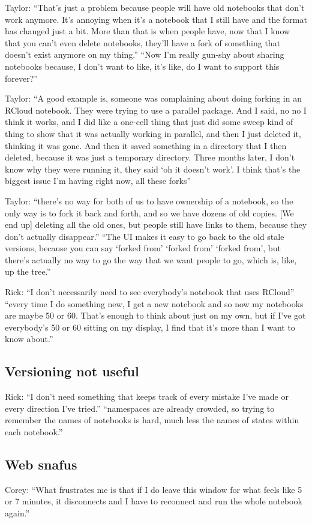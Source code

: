 Taylor: ``That's just a problem because people will have old notebooks that
don't work anymore. It's annoying when it's a notebook that I still have and the
format has changed just a bit. More than that is when people have, now that I
know that you can't even delete notebooks, they'll have a fork of something that
doesn't exist anymore on my thing.'' ``Now I'm really gun-shy about sharing
notebooks because, I don't want to like, it's like, do I want to support this
forever?''

Taylor: ``A good example is, someone was complaining about doing forking in an
RCloud notebook. They were trying to use a parallel package. And I said, no no I
think it works, and I did like a one-cell thing that just did some sweep kind of
thing to show that it was actually working in parallel, and then I just deleted
it, thinking it was gone. And then it saved something in a directory that I then
deleted, because it was just a temporary directory. Three months later, I don't
know why they were running it, they said `oh it doesn't work'. I think that's
the biggest issue I'm having right now, all these forks''

Taylor: ``there's no way for both of us to have ownership of a notebook, so the
only way is to fork it back and forth, and so we have dozens of old copies. [We
  end up] deleting all the old ones, but people still have links to them,
because they don't actually disappear.'' ``The UI makes it easy to go back to
the old stale versions, because you can say `forked from' `forked from' `forked
from', but there's actually no way to go the way that we want people to go,
which is, like, up the tree.''

Rick: ``I don't necessarily need to see everybody's notebook that uses RCloud''
``every time I do something new, I get a new notebook and so now my notebooks
are maybe 50 or 60. That's enough to think about just on my own, but if I've got
everybody's 50 or 60 sitting on my display, I find that it's more than I want to
know about.''


\subsection{Versioning not useful}
Rick: ``I don't need something that keeps track of every mistake I've made or
every direction I've tried.'' ``namespaces are already crowded, so trying to
remember the names of notebooks is hard, much less the names of states within
each notebook.''


\subsection{Web snafus}
Corey: ``What frustrates me is that if I do leave this window for what feels
like 5 or 7 minutes, it disconnects and I have to reconnect and run the whole
notebook again.''


